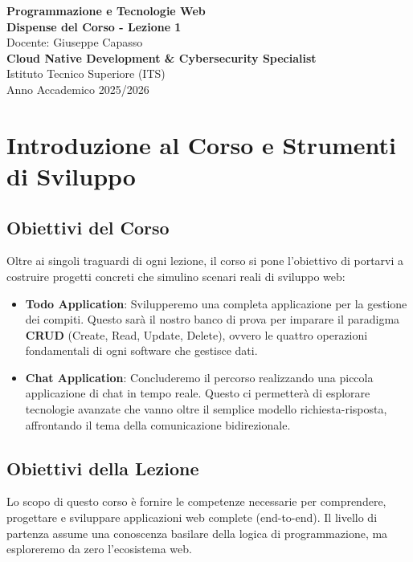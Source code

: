 \documentclass[11pt,a4paper]{report}
\begin{document}
\begin{titlepage}
    \centering
    \vspace*{4cm}
    {\Huge \textbf{\color{primary} Programmazione e Tecnologie Web}} \\[1.5cm]
    {\Large \textbf{Dispense del Corso - Lezione 1}} \\[0.5cm]
    {\large Docente: Giuseppe Capasso} \\[1.5cm]
    {\normalsize \textbf{Cloud Native Development \& Cybersecurity Specialist}} \\
    {\normalsize Istituto Tecnico Superiore (ITS)} \\
    \vfill
    {\normalsize Anno Accademico 2025/2026}
\end{titlepage}

\tableofcontents
\newpage

\chapter*{Introduzione al Corso e Strumenti di Sviluppo}

\section*{Obiettivi del Corso}
Oltre ai singoli traguardi di ogni lezione, il corso si pone l'obiettivo di portarvi a costruire progetti concreti che simulino scenari reali di sviluppo web:
\begin{itemize}
    \item \textbf{Todo Application}: Svilupperemo una completa applicazione per la gestione dei compiti. Questo sarà il nostro banco di prova per imparare il paradigma \textbf{CRUD} (Create, Read, Update, Delete), ovvero le quattro operazioni fondamentali di ogni software che gestisce dati.
    \item \textbf{Chat Application}: Concluderemo il percorso realizzando una piccola applicazione di chat in tempo reale. Questo ci permetterà di esplorare tecnologie avanzate che vanno oltre il semplice modello richiesta-risposta, affrontando il tema della comunicazione bidirezionale.
\end{itemize}

\section*{Obiettivi della Lezione}
Lo scopo di questo corso è fornire le competenze necessarie per comprendere, progettare e sviluppare applicazioni web complete (end-to-end). Il livello di partenza assume una conoscenza basilare della logica di programmazione, ma esploreremo da zero l'ecosistema web. 
\end{document}

